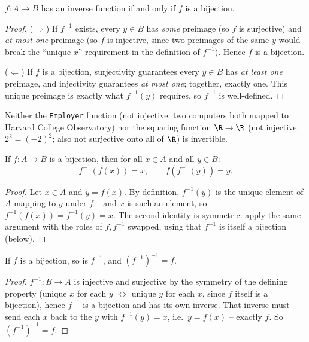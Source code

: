 \begin{theorem}
$f: A \to B$ has an inverse function if and only if $f$ is a bijection.
\end{theorem}
\begin{proof}
($\Rightarrow$) If $f^{-1}$ exists, every $y \in B$ has \emph{some} preimage (so $f$ is surjective) and \emph{at most one} preimage (so $f$ is injective, since two preimages of the same $y$ would break the ``unique $x$'' requirement in the definition of $f^{-1}$). Hence $f$ is a bijection.

($\Leftarrow$) If $f$ is a bijection, surjectivity guarantees every $y \in B$ has \emph{at least one} preimage, and injectivity guarantees \emph{at most one}; together, exactly one. This unique preimage is exactly what $f^{-1}(y)$ requires, so $f^{-1}$ is well-defined.
\end{proof}

\begin{note}
Neither the \texttt{Employer} function (not injective: two computers both mapped to Harvard College Observatory) nor the squaring function $\R \to \R$ (not injective: $2^2=(-2)^2$; also not surjective onto all of $\R$) is invertible.
\end{note}

\begin{proposition}
If $f: A \to B$ is a bijection, then for all $x \in A$ and all $y \in B$:
\[
f^{-1}(f(x)) = x, \qquad f(f^{-1}(y)) = y.
\]
\end{proposition}
\begin{proof}
Let $x \in A$ and $y = f(x)$. By definition, $f^{-1}(y)$ is the unique element of $A$ mapping to $y$ under $f$ -- and $x$ is such an element, so $f^{-1}(f(x)) = f^{-1}(y) = x$. The second identity is symmetric: apply the same argument with the roles of $f, f^{-1}$ swapped, using that $f^{-1}$ is itself a bijection (below).
\end{proof}

\begin{proposition}
If $f$ is a bijection, so is $f^{-1}$, and $(f^{-1})^{-1} = f$.
\end{proposition}
\begin{proof}
$f^{-1}: B \to A$ is injective and surjective by the symmetry of the defining property (unique $x$ for each $y$ $\Leftrightarrow$ unique $y$ for each $x$, since $f$ itself is a bijection), hence $f^{-1}$ is a bijection and has its own inverse. That inverse must send each $x$ back to the $y$ with $f^{-1}(y)=x$, i.e.\ $y=f(x)$ -- exactly $f$. So $(f^{-1})^{-1}=f$.
\end{proof}

